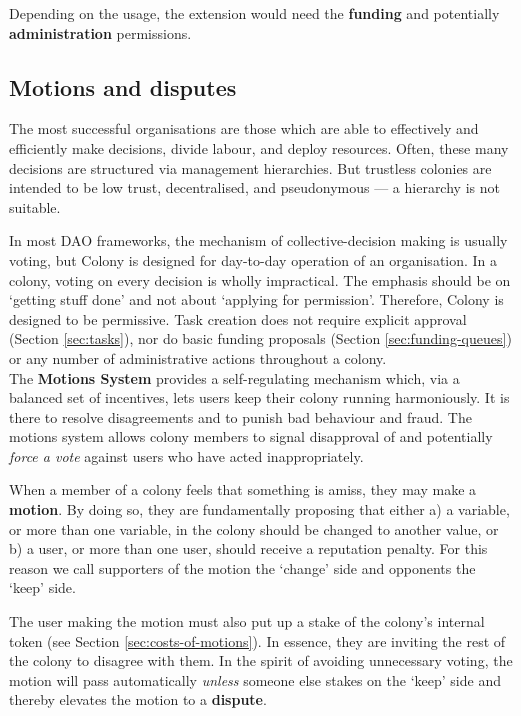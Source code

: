 Depending on the usage, the extension would need the \textbf{funding} and potentially \textbf{administration} permissions.

\subsection{Motions and disputes}\label{sec:motions-and-disputes}

The most successful organisations are those which are able to effectively and efficiently make decisions, divide labour, and deploy resources. Often, these many decisions are structured via management hierarchies. But trustless colonies are intended to be low trust, decentralised, and pseudonymous --- a hierarchy is not suitable.

In most DAO frameworks, the mechanism of collective-decision making is usually voting, but Colony is designed for day-to-day operation of an organisation. In a colony, voting on every decision is wholly impractical. The emphasis should be on `getting stuff done' and not about `applying for permission'. Therefore, Colony is designed to be permissive. Task creation does not require explicit approval (Section \ref{sec:tasks}), nor do basic funding proposals (Section \ref{sec:funding-queues}) or any number of administrative actions throughout a colony. \\

The \textbf{Motions System} provides a self-regulating mechanism which, via a balanced set of incentives, lets users keep their colony running harmoniously. It is there to resolve disagreements and to punish bad behaviour and fraud. The motions system allows colony members to signal disapproval of and potentially \textit{force a vote} against users who have acted inappropriately.

When a member of a colony feels that something is amiss, they may make a \textbf{motion}. By doing so, they are fundamentally proposing that either a) a variable, or more than one variable, in the colony should be changed to another value, or b) a user, or more than one user, should receive a reputation penalty. For this reason we call supporters of the motion the `change' side and opponents the `keep' side.

The user making the motion must also put up a stake of the colony's internal token (see Section \ref{sec:costs-of-motions}). In essence, they are inviting the rest of the colony to disagree with them. In the spirit of avoiding unnecessary voting, the motion will pass automatically \emph{unless} someone else stakes on the `keep' side and thereby elevates the motion to a \textbf{dispute}.

